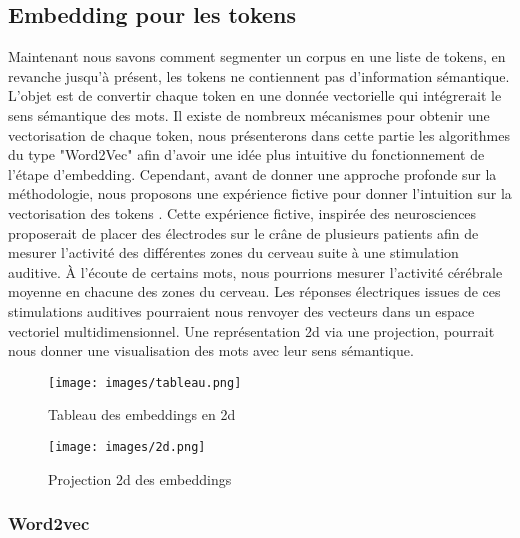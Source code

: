 \documentclass[12pt]{article}
\theoremstyle{definition}
\begin{document}
	
	\subsection{Embedding pour les tokens}

	Maintenant nous savons comment segmenter un corpus en une liste de tokens, en revanche jusqu'à présent, les tokens ne contiennent pas d'information sémantique. L'objet est de convertir chaque token en une donnée vectorielle qui intégrerait le sens sémantique des mots. Il existe de nombreux mécanismes pour obtenir une vectorisation de chaque token, nous présenterons dans cette partie les algorithmes du type "Word2Vec" afin d'avoir une idée plus intuitive du fonctionnement de l'étape d'embedding. Cependant, avant de donner une approche profonde sur la méthodologie, nous proposons une expérience fictive pour donner l'intuition sur la vectorisation des tokens \cite{video_embedding}. Cette expérience fictive, inspirée des neurosciences proposerait de placer des électrodes sur le crâne de plusieurs patients afin de mesurer l’activité des différentes zones du cerveau suite à une stimulation auditive. À l’écoute de certains mots, nous pourrions mesurer l’activité cérébrale moyenne en chacune des zones du cerveau. Les réponses électriques issues de ces stimulations auditives pourraient nous renvoyer des vecteurs dans un espace vectoriel multidimensionnel. Une représentation 2d via une projection, pourrait nous donner une visualisation des mots avec leur sens sémantique. \\[1cm] 
	

\begin{figure}[!h]  %
	\centering
	\begin{minipage}[t]{0.45\textwidth}
		\centering
		\texttt{[image: images/tableau.png]}
		\caption{Tableau des embeddings en 2d}
	\end{minipage}\hfill
	\begin{minipage}[t]{0.45\textwidth}
		\centering
		\texttt{[image: images/2d.png]}
		\caption{Projection 2d des embeddings}
	\end{minipage}
\end{figure}



	\subsubsection{Word2vec}
	
\end{document}
